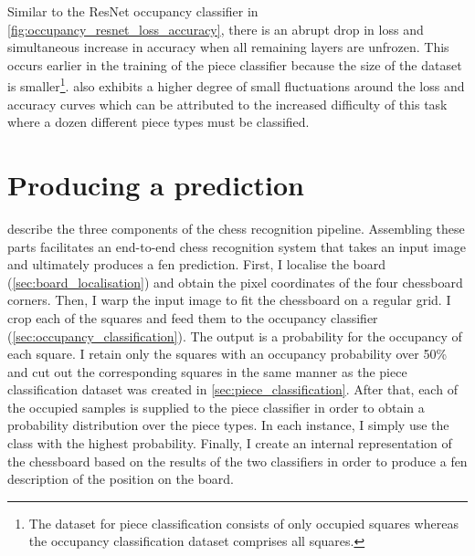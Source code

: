 \documentclass[../report.tex]{subfiles}
\begin{document}
Similar to the ResNet occupancy classifier in \cref{fig:occupancy_resnet_loss_accuracy}, there is an abrupt drop in loss and simultaneous increase in accuracy when all remaining layers are unfrozen.
This occurs earlier in the training of the piece classifier because the size of the dataset is smaller\footnote{The dataset for piece classification consists of only occupied squares whereas the occupancy classification dataset comprises all squares.}.
 also exhibits a higher degree of small fluctuations around the loss and accuracy curves which can be attributed to the increased difficulty of this task where a dozen different piece types must be classified.

\section{Producing a prediction}
\label{sec:preparing_results}
 describe the three components of the chess recognition pipeline.
Assembling these parts facilitates an end-to-end chess recognition system that takes an input image and ultimately produces a \gls{fen} prediction.
First, I localise the board (\cref{sec:board_localisation}) and obtain the pixel coordinates of the four chessboard corners.
Then, I warp the input image to fit the chessboard on a regular grid.
I crop each of the squares and feed them to the occupancy classifier (\cref{sec:occupancy_classification}).
The output is a probability for the occupancy of each square.
I retain only the squares with an occupancy probability over 50\% and cut out the corresponding squares in the same manner as the piece classification dataset was created in \cref{sec:piece_classification}.
After that, each of the occupied samples is supplied to the piece classifier in order to obtain a probability distribution over the piece types.
In each instance, I simply use the class with the highest probability.
Finally, I create an internal representation of the chessboard based on the results of the two classifiers in order to produce a \gls{fen} description of the position on the board.
\end{document}
